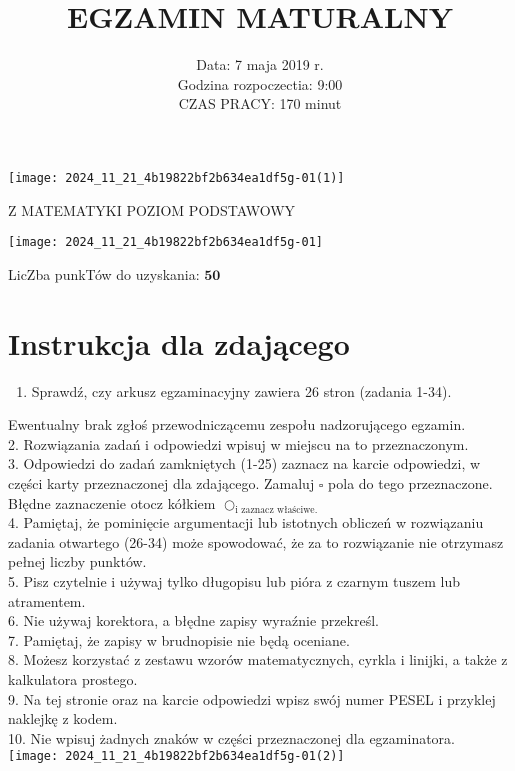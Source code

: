 \documentclass[10pt]{article}
\title{EGZAMIN MATURALNY }
\author{Data: 7 maja 2019 r.\\
Godzina rozpoczectia: 9:00\\
CZAS PRACY: 170 minut}
\date{}
\begin{document}
\maketitle
\begin{center}
\texttt{[image: 2024\_11\_21\_4b19822bf2b634ea1df5g-01(1)]}
\end{center}

Z MATEMATYKI POZIOM PODSTAWOWY

\begin{center}
\texttt{[image: 2024\_11\_21\_4b19822bf2b634ea1df5g-01]}
\end{center}

LicZba punkTów do uzyskania: \(\mathbf{5 0}\)

\section*{Instrukcja dla zdającego}
\begin{enumerate}
  \item Sprawdź, czy arkusz egzaminacyjny zawiera 26 stron (zadania 1-34).
\end{enumerate}

Ewentualny brak zgłoś przewodniczącemu zespołu nadzorującego egzamin.\\
2. Rozwiązania zadań i odpowiedzi wpisuj w miejscu na to przeznaczonym.\\
3. Odpowiedzi do zadań zamkniętych (1-25) zaznacz na karcie odpowiedzi, w części karty przeznaczonej dla zdającego. Zamaluj \(\square\) pola do tego przeznaczone. Błędne zaznaczenie otocz kółkiem \(\bigcirc_{\text {i zaznacz właściwe. }}\)\\
4. Pamiętaj, że pominięcie argumentacji lub istotnych obliczeń w rozwiązaniu zadania otwartego (26-34) może spowodować, że za to rozwiązanie nie otrzymasz pełnej liczby punktów.\\
5. Pisz czytelnie i używaj tylko długopisu lub pióra z czarnym tuszem lub atramentem.\\
6. Nie używaj korektora, a błędne zapisy wyraźnie przekreśl.\\
7. Pamiętaj, że zapisy w brudnopisie nie będą oceniane.\\
8. Możesz korzystać z zestawu wzorów matematycznych, cyrkla i linijki, a także z kalkulatora prostego.\\
9. Na tej stronie oraz na karcie odpowiedzi wpisz swój numer PESEL i przyklej naklejkę z kodem.\\
10. Nie wpisuj żadnych znaków w części przeznaczonej dla egzaminatora.\\
\texttt{[image: 2024\_11\_21\_4b19822bf2b634ea1df5g-01(2)]}
\end{document}
